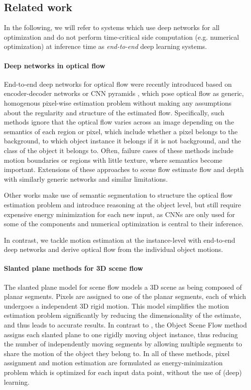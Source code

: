 \subsection{Related work}

In the following, we will refer to systems which use deep networks for all
optimization and do not perform time-critical side computation (e.g. numerical optimization)
at inference time as \emph{end-to-end} deep learning systems.

\paragraph{Deep networks in optical flow}

End-to-end deep networks for optical flow were recently introduced
based on encoder-decoder networks or CNN pyramids \cite{FlowNet, FlowNet2, SPyNet},
which pose optical flow as generic, homogenous pixel-wise estimation problem without making any assumptions
about the regularity and structure of the estimated flow.
Specifically, such methods ignore that the optical flow varies across an
image depending on the semantics of each region or pixel, which include whether a
pixel belongs to the background, to which object instance it belongs if it is not background,
and the class of the object it belongs to.
Often, failure cases of these methods include motion boundaries or regions with little texture,
where semantics become important.
Extensions of these approaches to scene flow estimate flow and depth
with similarly generic networks \cite{SceneFlowDataset} and similar limitations.

Other works \cite{FlowLayers, ESI, MRFlow} make use of semantic segmentation to structure %
the optical flow estimation problem and introduce reasoning at the object level,
but still require expensive energy minimization for each
new input, as CNNs are only used for some of the components and numerical
optimization is central to their inference.

In contrast, we tackle motion estimation at the instance-level with end-to-end
deep networks and derive optical flow from the individual object motions.

\paragraph{Slanted plane methods for 3D scene flow}
The slanted plane model for scene flow \cite{PRSF, PRSM} models a 3D scene as being
composed of planar segments. Pixels are assigned to one of the planar segments,
each of which undergoes a independent 3D rigid motion.
This model simplifies the motion estimation problem significantly by reducing the dimensionality
of the estimate, and thus leads to accurate results.
In contrast to \cite{PRSF, PRSM}, the Object Scene Flow method \cite{KITTI2015}
assigns each slanted plane to one rigidly moving object instance, thus
reducing the number of independently moving segments by allowing multiple
segments to share the motion of the object they belong to.
In all of these methods, pixel assignment and motion estimation are formulated
as energy-minimization problem which is optimized for each input data point,
without the use of (deep) learning.

